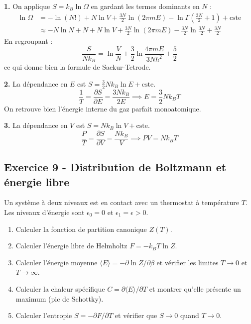 \documentclass[12pt,a4paper]{article}
\begin{document}
\begin{boitecorrige}
\textbf{1.} On applique $S = k_B\ln\Omega$ en gardant les termes dominants en $N$ :
\begin{align*}
\ln\Omega &= -\ln(N!) + N\ln V + \frac{3N}{2}\ln(2\pi mE) - \ln\Gamma\!\left(\frac{3N}{2}+1\right) + \text{cste}\\
&\approx -N\ln N + N + N\ln V + \frac{3N}{2}\ln(2\pi mE) - \frac{3N}{2}\ln\frac{3N}{2} + \frac{3N}{2}
\end{align*}
En regroupant :
\[
\frac{S}{Nk_B} = \ln\frac{V}{N} + \frac{3}{2}\ln\frac{4\pi mE}{3Nh^2} + \frac{5}{2}
\]
ce qui donne bien la formule de Sackur-Tetrode.

\textbf{2.} La dépendance en $E$ est $S = \frac{3}{2}Nk_B\ln E + \text{cste}$.
\[
\frac{1}{T} = \frac{\partial S}{\partial E} = \frac{3Nk_B}{2E} \implies \boxed{E = \frac{3}{2}Nk_BT}
\]
On retrouve bien l'énergie interne du gaz parfait monoatomique.

\textbf{3.} La dépendance en $V$ est $S = Nk_B\ln V + \text{cste}$.
\[
\frac{P}{T} = \frac{\partial S}{\partial V} = \frac{Nk_B}{V} \implies \boxed{PV = Nk_BT}
\]
\end{boitecorrige}

\subsection*{Exercice 9 - Distribution de Boltzmann et énergie libre \niveau{\moyen}}

\begin{boiteexercice}
Un système à deux niveaux est en contact avec un thermostat à température $T$. Les niveaux d'énergie sont $\epsilon_0 = 0$ et $\epsilon_1 = \epsilon > 0$.
\begin{enumerate}
  \item Calculer la fonction de partition canonique $Z(T)$.
  \item Calculer l'énergie libre de Helmholtz $F = -k_BT\ln Z$.
  \item Calculer l'énergie moyenne $\langle E\rangle = -\partial\ln Z/\partial\beta$ et vérifier les limites $T\to0$ et $T\to\infty$.
  \item Calculer la chaleur spécifique $C = \partial\langle E\rangle/\partial T$ et montrer qu'elle présente un maximum (pic de Schottky).
  \item Calculer l'entropie $S = -\partial F/\partial T$ et vérifier que $S\to0$ quand $T\to0$.
\end{enumerate}
\end{boiteexercice}
\end{document}
